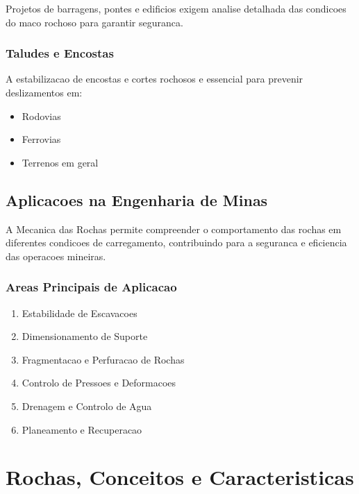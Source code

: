 \documentclass[12pt,a4paper,twoside]{book}
\begin{document}
Projetos de barragens, pontes e edificios exigem analise detalhada das condicoes do maco rochoso 
para garantir seguranca.

\subsection{Taludes e Encostas}

A estabilizacao de encostas e cortes rochosos e essencial para prevenir deslizamentos em:
\begin{itemize}
    \item Rodovias
    \item Ferrovias
    \item Terrenos em geral
\end{itemize}

\section{Aplicacoes na Engenharia de Minas}

A Mecanica das Rochas permite compreender o comportamento das rochas em diferentes condicoes de 
carregamento, contribuindo para a seguranca e eficiencia das operacoes mineiras.

\subsection{Areas Principais de Aplicacao}

\begin{enumerate}
    \item Estabilidade de Escavacoes
    \item Dimensionamento de Suporte
    \item Fragmentacao e Perfuracao de Rochas
    \item Controlo de Pressoes e Deformacoes
    \item Drenagem e Controlo de Agua
    \item Planeamento e Recuperacao
\end{enumerate}

\chapter{Rochas, Conceitos e Caracteristicas}
\end{document}
